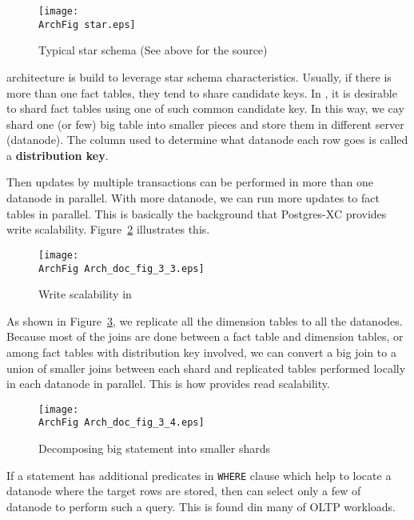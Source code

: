   \begin{figure}[htp]
	  \begin{center}
		  \texttt{[image: \\ArchFig star.eps]}
		  \caption{\label{archfig:3}Typical star schema (See above for the source)}
	  \end{center}
  \end{figure}
 
  \XC{} architecture is build to leverage star schema characteristics.
  Usually, if there is more than one fact tables, they tend to share candidate keys.
  In \XC, it is desirable to shard fact tables using one of such common candidate key.
  In this way, we cay shard one (or few) big table into smaller pieces and store them
  in different server (datanode).
  The column used to determine what datanode each row goes is called a \textbf{distribution key}.
  
  Then updates by multiple transactions can be performed in more than one datanode in parallel.
  With more datanode, we can run more updates to fact tables in parallel.
  This is basically the background that Postgres-XC provides write scalability.
  Figure~\ref{archfig:4} illustrates this.
  
  \begin{figure}[htp]
	  \begin{center}
		  \texttt{[image: \\ArchFig Arch\_doc\_fig\_3\_3.eps]}
		  \caption{\label{archfig:4}Write scalability in \XC}
	  \end{center}
  \end{figure}
  
  As shown in Figure~\ref{archfig:5}, we replicate all the dimension tables to all the datanodes.
  Because most of the joins are done between a fact table and dimension tables,
  or among fact tables with distribution key involved,
  we can convert a big join to a union of smaller joins between each shard and replicated tables
  performed locally in each datanode in parallel.
  This is how \XC{} provides read scalability.

  \begin{figure}[htp]
	  \begin{center}
		  \texttt{[image: \\ArchFig Arch\_doc\_fig\_3\_4.eps]}
		  \caption{\label{archfig:5}Decomposing big statement into smaller shards}
	  \end{center}
  \end{figure}
  
  If a statement has additional predicates in \texttt{WHERE} clause which help to locate
  a datanode where the target rows are stored, then \XC{} can select only a few of
  datanode to perform such a query.
  This is found din many of OLTP workloads.
  
